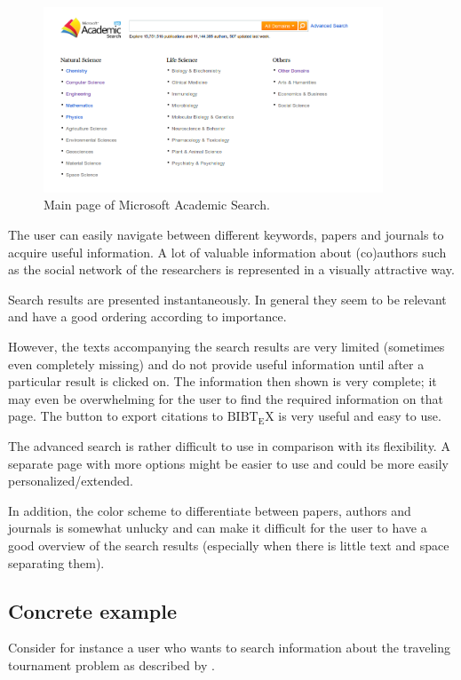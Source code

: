 \documentclass[a4paper,english,10pt]{scrartcl}
\begin{document}
\begin{figure}[hbpt]
 \centering
 \includegraphics[width=0.9\textwidth]{main}
 \caption{Main page of Microsoft Academic Search.}
 \label{mainsearch}
\end{figure}

The user can easily navigate between different keywords, papers and journals to acquire useful information. 
A lot of valuable information about (co)authors such as the social network of the researchers is represented in a visually attractive way. 

Search results are presented instantaneously. In general they seem to be relevant and have a good ordering according to importance.

However, the texts accompanying the search results are very limited (sometimes even completely missing) and do not provide useful information until after a particular result is clicked on. The information then shown is very complete; it may even be overwhelming for the user to find the required information on that page.
The button to export citations to ${\mathrm{B{\scriptstyle{IB}} \! T\!_{\displaystyle E} \! X}}$ is very useful and easy to use.

The advanced search is rather difficult to use in comparison with its flexibility. A separate page with more options might be easier to use and could be more easily personalized/extended.

In addition, the color scheme to differentiate between papers, authors and journals is somewhat unlucky and can make it difficult for the user to have a good overview of the search results (especially when there is little text and space separating them).

\subsection{Concrete example}
Consider for instance a user who wants to search information about the traveling tournament problem as described by \cite{ttp}.
\end{document}
